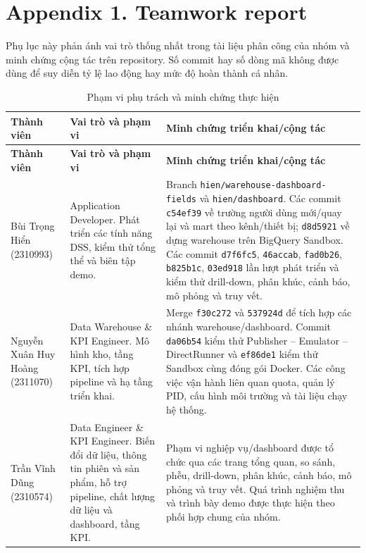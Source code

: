 \documentclass[a4paper, 11pt]{article}
\begin{document}
\pagebreak
\nocite{*}
\printbibliography[
  heading=bibintoc,
  title={References}
]

\pagebreak
\section*{Appendix 1. Teamwork report}
\label{sec:teamwork-report}

Phụ lục này phản ánh vai trò thống nhất trong tài liệu phân công của nhóm và minh chứng cộng tác trên repository. Số commit hay số dòng mã không được dùng để suy diễn tỷ lệ lao động hay mức độ hoàn thành cá nhân.

\begin{xltabular}{\textwidth}{|>{\raggedright\arraybackslash}p{3.1cm}|>{\raggedright\arraybackslash}p{4.2cm}|>{\raggedright\arraybackslash}X|}
\caption{Phạm vi phụ trách và minh chứng thực hiện}
\label{tab:teamwork-evidence} \\
\hline
\textbf{Thành viên} & \textbf{Vai trò và phạm vi} & \textbf{Minh chứng triển khai/cộng tác} \\
\hline
\endfirsthead
\hline
\textbf{Thành viên} & \textbf{Vai trò và phạm vi} & \textbf{Minh chứng triển khai/cộng tác} \\
\hline
\endhead
\hline
\endfoot
\hline
\endlastfoot

Bùi Trọng Hiển (2310993)
& Application Developer. Phát triển các tính năng DSS, kiểm thử tổng thể và biên tập demo.
& Branch \texttt{hien/warehouse-dashboard-fields} và \texttt{hien/dashboard}. Các commit \texttt{c54ef39} về trường người dùng mới/quay lại và mart theo kênh/thiết bị; \texttt{d8d5921} về dựng warehouse trên BigQuery Sandbox. Các commit \texttt{d7f6fc5}, \texttt{46accab}, \texttt{fad0b26}, \texttt{b825b1c}, \texttt{03ed918} lần lượt phát triển và kiểm thử drill-down, phân khúc, cảnh báo, mô phỏng và truy vết. \\
\hline
Nguyễn Xuân Huy Hoàng (2311070)
& Data Warehouse \& KPI Engineer. Mô hình kho, tầng KPI, tích hợp pipeline và hạ tầng triển khai.
& Merge \texttt{f30c272} và \texttt{537924d} để tích hợp các nhánh warehouse/dashboard. Commit \texttt{da06b54} kiểm thử Publisher -- Emulator -- DirectRunner và \texttt{ef86de1} kiểm thử Sandbox cùng đóng gói Docker. Các công việc vận hành liên quan quota, quản lý PID, cấu hình môi trường và tài liệu chạy hệ thống. \\
\hline
Trần Vĩnh Dũng (2310574)
& Data Engineer \& KPI Engineer. Biến đổi dữ liệu, thông tin phiên và sản phẩm, hỗ trợ pipeline, chất lượng dữ liệu và dashboard, tầng KPI.
& Phạm vi nghiệp vụ/dashboard được tổ chức qua các trang tổng quan, so sánh, phễu, drill-down, phân khúc, cảnh báo, mô phỏng và truy vết. Quá trình nghiệm thu và trình bày demo được thực hiện theo phối hợp chung của nhóm. \\
\end{xltabular}
\end{document}
